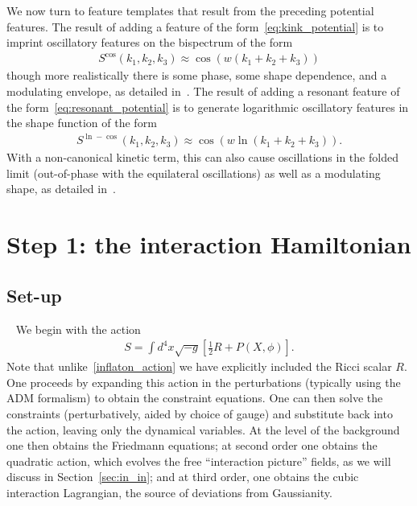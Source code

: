 We now turn to feature templates that result from the preceding potential features.
The result of adding a feature of the form~\eqref{eq:kink_potential}
is to imprint oscillatory features on the bispectrum of the form
\begin{align}\label{cos_shape}
    S^{\cos}(k_1,k_2,k_3) \approx \cos(w(k_1+k_2+k_3))
\end{align}
though more realistically there is some phase, some shape dependence, and a modulating envelope,
as detailed in~\cite{adshead}.
The result of adding a resonant feature of the form~\eqref{eq:resonant_potential}
is to generate logarithmic oscillatory features in the shape function of the form
\begin{align}\label{ln_cos_shape}
    S^{\ln-\cos}(k_1,k_2,k_3) \approx \cos(w\ln(k_1+k_2+k_3)).
\end{align}
With a non-canonical kinetic term, this can also
cause oscillations in the folded limit (out-of-phase
with the equilateral oscillations) as well as a modulating shape,
as detailed in~\cite{chen_folded_resonant}.


    \section{Step 1: the interaction Hamiltonian}
    \subsection{Set-up}\
    We begin with the action
    \begin{align}\label{gr_action}
        S=\int d^4x\sqrt{-g}\left[\frac{1}{2}R+P(X, \phi)\right].
    \end{align}
    Note that unlike~\eqref{inflaton_action} we have explicitly included the
    Ricci scalar $R$.
    One proceeds by expanding this action in the perturbations (typically
    using the ADM formalism)
    to obtain the constraint equations. One can then solve the constraints
    (perturbatively, aided by choice of gauge) and substitute
    back into the action, leaving only the dynamical variables.
    At the level of the background one then obtains the Friedmann equations;
    at second order one obtains the quadratic action, which evolves the
    free ``interaction picture'' fields, as we will discuss in Section~\ref{sec:in_in};
    and at third order, one obtains the cubic
    interaction Lagrangian, the source of deviations from Gaussianity.


